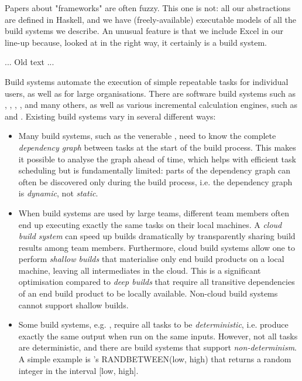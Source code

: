 Papers about "frameworks" are often fuzzy.  This one is not: all our
abstractions are defined in Haskell, and we have (freely-available)
executable models of all the build systems we describe.  An unusual
feature is that we include Excel in our line-up because, looked at
in the right way, it certainly is a build system.


... Old text ...

Build systems automate the execution of simple repeatable tasks for individual
users, as well as for large organisations. There are software build systems such
as \Make, \Ninja, \Shake, \Bazel, \Buck and many others, as well as various
incremental calculation engines, such as \Excel and \Calc. Existing build
systems vary in several different ways:

\begin{itemize}
    \item Many build systems, such as the venerable \Make, need to know the
    complete \emph{dependency graph} between tasks at the start of the build
    process. This makes it possible to analyse the graph ahead of time, which
    helps with efficient task scheduling but is fundamentally limited: parts of
    the dependency graph can often be discovered only during the build process,
    i.e. the dependency graph is \emph{dynamic}, not \emph{static}.

    \item When build systems are used by large teams, different team members
    often end up executing exactly the same tasks on their local machines.
    A \emph{cloud build system} can speed up builds dramatically by
    transparently sharing build results among team members. Furthermore, cloud
    build systems allow one to perform \emph{shallow builds} that materialise
    only end build products on a local machine, leaving all intermediates in the
    cloud. This is a significant optimisation compared to \emph{deep builds}
    that require all transitive dependencies of an end build product to be
    locally available. Non-cloud build systems cannot support shallow builds.

    \item Some build systems, e.g. \Buck, require all tasks to be
    \emph{deterministic}, i.e. produce exactly the same output when run on the
    same inputs. However, not all tasks are deterministic, and there are build
    systems that support \emph{non-determinism}. A simple example is \Excel's
    \textsf{RANDBETWEEN(low, high)} that returns a random integer in the
    interval \textsf{[low, high]}.


\end{itemize}

